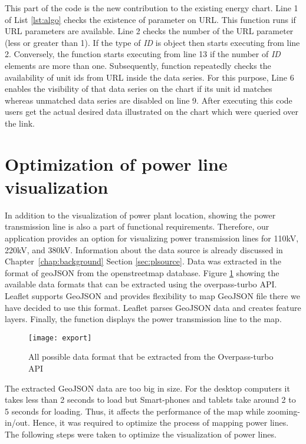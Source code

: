 This part of the code is the new contribution to the existing energy chart. Line 1 of List \ref{lst:algo} checks the existence of parameter on URL. This function runs if URL parameters are available. Line 2 checks the number of the URL parameter (less or greater than 1). If the type of \textit{ID} is object then starts executing from line 2. Conversely, the function starts executing from line 13 if the number of \textit{ID} elements are more than one. Subsequently, function repeatedly checks the availability of unit ids from URL inside the data series. For this purpose, Line 6 enables the visibility of that data series on the chart if its unit id matches whereas unmatched data series are disabled on line 9. After executing this code users get the actual desired data illustrated on the chart which were queried over the link.

\section{Optimization of power line visualization}
\label{sec:powerLine}

In addition to the visualization of power plant location, showing the power transmission line is also a part of functional requirements. Therefore, our application provides an option for visualizing power transmission lines for 110kV, 220kV, and 380kV. Information about the data source is already discussed in Chapter~\ref{chap:background} Section \ref{sec:plsource}. Data was extracted in the format of geoJSON from the openstreetmap database. Figure \ref{fig:export} showing the available data formats that can be extracted using the overpass-turbo API. Leaflet supports GeoJSON and provides flexibility to map GeoJSON file there we have decided to use this format. Leaflet parses GeoJSON data and creates feature layers. Finally, the function displays the power transmission line to the map.

\begin{figure}
\centering
\texttt{[image: export]}
\caption{All possible data format that be extracted from the Overpass-turbo API}
\label{fig:export}
\end{figure}

The extracted GeoJSON data are too big in size. For the desktop computers it takes less than 2 seconds to load but Smart-phones and tablets take around 2 to 5 seconds for loading. Thus, it affects the performance of the map while zooming-in/out. Hence, it was required to optimize the process of mapping power lines. The following steps were taken to optimize the visualization of power lines.

